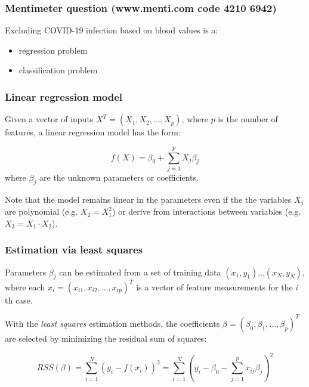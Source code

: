 \documentclass[notes]{beamer}          %
\begin{document}
\begin{frame}
\frametitle{Mentimeter question (www.menti.com code 4210 6942)}

Excluding COVID-19 infection based on blood values is a:
\begin{itemize}
    \item regression problem
    \item classification problem
\end{itemize}
\end{frame}

\begin{frame}
\frametitle{Linear regression model}
Given a vector of inputs $X^T = (X_1, X_2, \dots, X_p)$, where $p$ is the number of features, a linear regression model has the form:

\begin{equation*}
f(X)=\beta_0 + \sum_{j=1}^p X_j\beta_j
\end{equation*}
where $\beta_j$ are the unknown parameters or coefficients. 

\vspace{5mm} 

Note that the model remains linear in the parameters even if the the variables $X_j$ are polynomial (e.g. $X_2 = X_1^2$) or derive from interactions between variables (e.g. $X_3 = X_1 \cdot X_2$).

\end{frame}

\begin{frame}
\frametitle{Estimation via least squares}
Parameters $\beta_j$ can be estimated from a set of training data $(x_1,y_1) \dots (x_N,y_N)$, where each $x_i=(x_{i1}, x_{i2}, \dots, x_{ip})^T$ is a vector of feature measurements for the $i$th case.

\vspace{5mm} 

With the \textit{least squares} estimation methods, the coefficients $\beta=(\beta_0, \beta_1, \dots, \beta_p)^T$ are selected by minimizing the residual sum of squares:

\begin{equation*}
RSS(\beta) = \sum_{i=1}^N (y_i - f(x_i))^2 = \sum_{i=1}^N (y_i - \beta_0 -  \sum_{j=1}^p x_{ij}\beta_j)^2
\end{equation*}
\end{frame}
\end{document}
